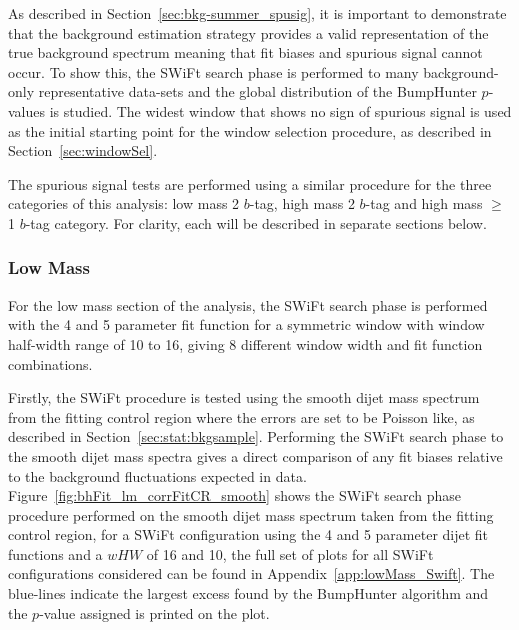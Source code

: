 As described in Section~\ref{sec:bkg-summer_spusig}, it is important to demonstrate that the background estimation strategy
provides a valid representation of the true background spectrum meaning that fit biases and spurious signal cannot occur.
To show this, the SWiFt search phase is performed to many background-only representative
data-sets and the global distribution of the {\sc BumpHunter} \mbox{$p$-values} is studied.
The widest window that shows no sign of spurious signal is used as the initial starting point for the window selection procedure, as described in Section~\ref{sec:windowSel}.

The spurious signal tests are performed using a similar procedure for the three categories of this analysis:
low mass 2 $b$-tag, high mass 2 $b$-tag and high mass $\geq$1 $b$-tag category.
For clarity, each will be described in separate sections below.

\subsubsection{Low Mass}
\label{sec:lowmass_spuriousSignal}

For the low mass section of the analysis,
the SWiFt search phase is performed with the 4 and 5 parameter fit function for a symmetric window with window half-width range of 10 to 16,
giving 8 different window width and fit function combinations.

Firstly, the SWiFt procedure is tested using the smooth dijet mass spectrum from the fitting control region
where the errors are set to be Poisson like,
as described in Section~\ref{sec:stat:bkgsample}.
Performing the SWiFt search phase to the smooth dijet mass spectra gives a direct comparison
of any fit biases relative to the background fluctuations expected in data.
Figure~\ref{fig:bhFit_lm_corrFitCR_smooth} shows the SWiFt search phase procedure
performed on the smooth dijet mass spectrum taken from the fitting control region,
for a SWiFt configuration using the 4 and 5 parameter dijet fit functions and a $wHW$ of 16 and 10,
the full set of plots for all SWiFt configurations considered can be found in Appendix~\ref{app:lowMass_Swift}.
The blue-lines indicate the largest excess found by the {\sc BumpHunter} algorithm and the \mbox{$p$-value} assigned is printed on the plot. 

